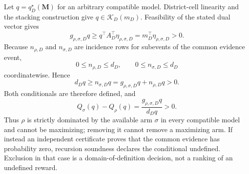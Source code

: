 Let \(q=q_D^\star(\mathbf M)\) for an arbitrary compatible model.  District-cell linearity and the stacking construction give \(q\in\mathcal K_D(m_D)\).  Feasibility of the stated dual vector gives
\[
g_{\rho,\sigma,D}q
\geq q^\top A_D^\top\eta_{\rho,\sigma,D}
=m_D^\top\eta_{\rho,\sigma,D}>0.
\]
Because \(n_{\rho,D}\) and \(n_{\sigma,D}\) are incidence rows for subevents of the common evidence event,
\[
0\leq n_{\rho,D}\leq d_D,
\qquad
0\leq n_{\sigma,D}\leq d_D
\]
coordinatewise.  Hence
\[
d_Dq\geq n_{\sigma,D}q
=g_{\rho,\sigma,D}q+n_{\rho,D}q>0.
\]
Both conditionals are therefore defined, and
\[
Q_\sigma(q)-Q_\rho(q)
=\frac{g_{\rho,\sigma,D}q}{d_Dq}>0.
\]
Thus \(\rho\) is strictly dominated by the available arm \(\sigma\) in every compatible model and cannot be maximizing; removing it cannot remove a maximizing arm.  If instead an independent certificate proves that the common evidence has probability zero, recursion soundness declares the conditional undefined.  Exclusion in that case is a domain-of-definition decision, not a ranking of an undefined reward.